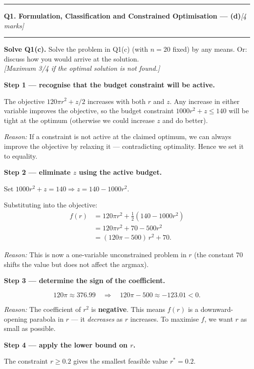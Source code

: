 \documentclass[10pt,a4paper]{article}
\newcommand{\sectitle}[2]{%
  \vspace{10pt}\noindent\rule{\linewidth}{0.8pt}\par\vspace{2pt}%
  {\large\textbf{#1}\hfill\normalsize\textit{[#2 marks]}}\par
  \vspace{2pt}\rule{\linewidth}{0.4pt}\vspace{4pt}}
\newcommand{\reason}[1]{%
  \begin{mdframed}[backgroundcolor=reasonbg, linewidth=0.4pt,
    innertopmargin=3pt, innerbottommargin=3pt,
    innerleftmargin=6pt, innerrightmargin=6pt]
    \small\textit{Reason:} \small #1
  \end{mdframed}\vspace{2pt}}
\begin{document}
\newpage
\sectitle{Q1. Formulation, Classification and Constrained Optimisation --- (d)}{4}

\noindent\textbf{Solve Q1(c).} Solve the problem in Q1(c) (with $n=20$
fixed) by any means. Or: discuss how you would arrive at the solution.\\
\textit{[Maximum 3/4 if the optimal solution is not found.]}

\vspace{6pt}
\textbf{Step 1 --- recognise that the budget constraint will be active.}

The objective $120\pi r^2 + z/2$ increases with both $r$ and $z$. Any
increase in either variable improves the objective, so the budget
constraint $1000r^2 + z \le 140$ will be tight at the optimum (otherwise
we could increase $z$ and do better).

\reason{If a constraint is not active at the claimed optimum, we can
        always improve the objective by relaxing it --- contradicting
        optimality. Hence we set it to equality.}

\textbf{Step 2 --- eliminate $z$ using the active budget.}

Set $1000r^2 + z = 140 \Rightarrow z = 140 - 1000r^2$.

Substituting into the objective:
\begin{align*}
  f(r) &= 120\pi r^2 + \tfrac{1}{2}(140 - 1000r^2) \\
       &= 120\pi r^2 + 70 - 500r^2 \\
       &= (120\pi - 500)\,r^2 + 70.
\end{align*}

\reason{This is now a one-variable unconstrained problem in $r$ (the
        constant $70$ shifts the value but does not affect the argmax).}

\textbf{Step 3 --- determine the sign of the coefficient.}

\[
  120\pi \approx 376.99 \quad\Rightarrow\quad 120\pi - 500 \approx -123.01 < 0.
\]

\reason{The coefficient of $r^2$ is \textbf{negative}. This means
        $f(r)$ is a downward-opening parabola in $r$ --- it
        \emph{decreases} as $r$ increases. To maximise $f$, we want
        $r$ as small as possible.}

\textbf{Step 4 --- apply the lower bound on $r$.}

The constraint $r \ge 0.2$ gives the smallest feasible value $r^* = 0.2$.
\end{document}
